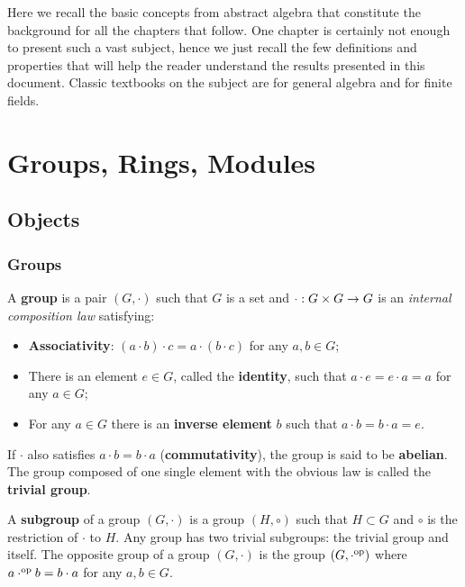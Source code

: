 Here we recall the basic concepts from abstract algebra that
constitute the background for all the chapters that follow. One
chapter is certainly not enough to present such a vast subject, hence
we just recall the few definitions and properties that will help the
reader understand the results presented in this document. Classic
textbooks on the subject are \cite{lang} for general algebra and
\cite{lidl+niederreiter:2} for finite fields.

\section{Groups, Rings, Modules}
\label{sec:ring-fields}

\subsection{Objects}
\label{sec:ring-fields:objects}

\subsubsection{Groups}

A \textbf{group} is a pair $(G,\cdot)$ such that $G$ is a
set and $\cdot:G\times G\rightarrow G$ is an \emph{internal composition law}
satisfying:
\begin{itemize}
\item {}\textbf{Associativity}: $(a\cdot b)\cdot c
  = a \cdot (b\cdot c)$ for any $a,b\in G$;
\item There is an element $e\in G$, called the
  \textbf{identity}, such that $a\cdot e =
  e\cdot a = a$ for any $a\in G$;
\item For any $a\in G$ there is an
  \textbf{inverse element} $b$ such that
  $a\cdot b = b\cdot a = e$.
\end{itemize}
If $\cdot$ also satisfies $a\cdot b=b\cdot a$
(\textbf{commutativity}), the group is said to be
\textbf{abelian}. The group composed of one
single element with the obvious law is called the
\textbf{trivial group}.

A \textbf{subgroup} of a group $(G,\cdot)$ is a group
$(H,\circ)$ such that $H\subset G$ and $\circ$ is the restriction of
$\cdot$ to $H$. Any group has two trivial subgroups: the trivial group
and itself. The 
opposite group of a group $(G,\cdot)$ is
the group $(G,\cdot^{\mathrm{op}})$ where $a\cdot^{\mathrm{op}} b=b\cdot a$ for any
$a,b\in G$.

